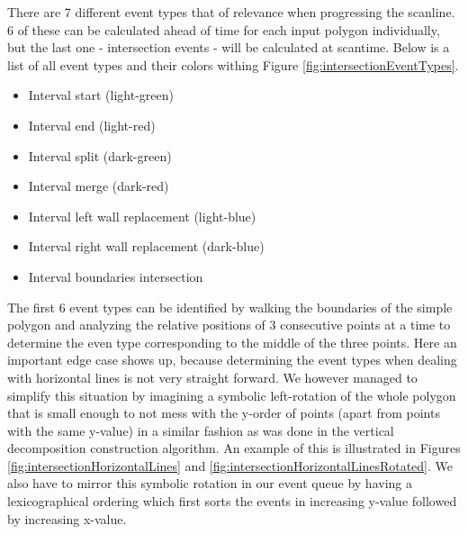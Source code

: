 \documentclass[12pt]{article}
\begin{document}
There are 7 different event types that of relevance when progressing the scanline. 6 of these can be calculated ahead of time for each input polygon individually, but the last one - intersection events - will be calculated at scantime. Below is a list of all event types and their colors withing Figure \ref{fig:intersectionEventTypes}.
\begin{itemize}
    \item Interval start (light-green)
    \item Interval end (light-red)
    \item Interval split (dark-green)
    \item Interval merge (dark-red)
    \item Interval left wall replacement (light-blue)
    \item Interval right wall replacement (dark-blue)
    \item Interval boundaries intersection
\end{itemize}
The first 6 event types can be identified by walking the boundaries of the simple polygon and analyzing the relative positions of 3 consecutive points at a time to determine the even type corresponding to the middle of the three points.
Here an important edge case shows up, because determining the event types when dealing with horizontal lines is not very straight forward. We however managed to simplify this situation by imagining a symbolic left-rotation of the whole polygon that is small enough to not mess with the y-order of points (apart from points with the same y-value) in a similar fashion as was done in the vertical decomposition construction algorithm. An example of this is illustrated in Figures \ref{fig:intersectionHorizontalLines} and \ref{fig:intersectionHorizontalLinesRotated}. We also have to mirror this symbolic rotation in our event queue by having a lexicographical ordering which first sorts the events in increasing y-value followed by increasing x-value.
\end{document}
